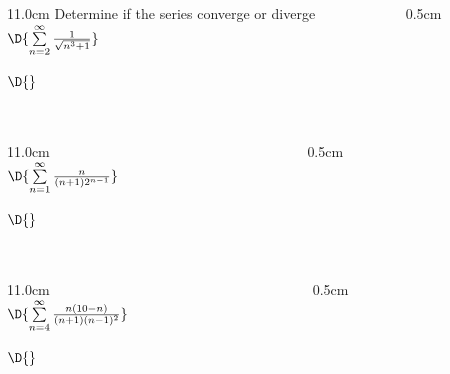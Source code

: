 \begin{frame}
\frametitle{}
\scriptsize

\vspace{0.2cm}

\begin{columns}
\begin{column}{11.0cm}
Determine if the series converge or diverge\\

$\D{\sum \limits_{n=2}^{\infty} \frac{1}{\sqrt{n^3 + 1}}}$

\vspace{4.0cm}

$\D{}$

\vspace{6.5cm}

\end{column}
\begin{column}{0.5cm}
	
\end{column}
\end{columns}
\end{frame}

\begin{frame}
\frametitle{}
\scriptsize

\vspace{0.2cm}

\begin{columns}
\begin{column}{11.0cm}
\\

$\D{\sum \limits_{n=1}^{\infty} \frac{n}{(n + 1)2^{n-1}}}$

\vspace{4.0cm}

$\D{}$

\vspace{6.5cm}

\end{column}
\begin{column}{0.5cm}
	
\end{column}
\end{columns}
\end{frame}

\begin{frame}
\frametitle{}
\scriptsize

\vspace{0.2cm}

\begin{columns}
\begin{column}{11.0cm}
\\

$\D{\sum \limits_{n=4}^{\infty} \frac{n(10-n)}{(n + 1)(n-1)^2}}$

\vspace{4.0cm}

$\D{}$

\vspace{6.5cm}

\end{column}
\begin{column}{0.5cm}
	
\end{column}
\end{columns}
\end{frame}

